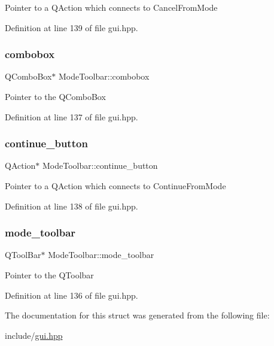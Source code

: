 Pointer to a Q\+Action which connects to Cancel\+From\+Mode 

Definition at line 139 of file gui.\+hpp.

\mbox{\label{structModeToolbar_ad0ba4f03ef2a44e2543add404a50b4f1}} 
\subsubsection{\texorpdfstring{combobox}{combobox}}
{\footnotesize\ttfamily Q\+Combo\+Box$\ast$ Mode\+Toolbar\+::combobox}

Pointer to the Q\+Combo\+Box 

Definition at line 137 of file gui.\+hpp.

\mbox{\label{structModeToolbar_af7d7766f5b1710abb382c42689e963ca}} 
\subsubsection{\texorpdfstring{continue\+\_\+button}{continue\_button}}
{\footnotesize\ttfamily Q\+Action$\ast$ Mode\+Toolbar\+::continue\+\_\+button}

Pointer to a Q\+Action which connects to Continue\+From\+Mode 

Definition at line 138 of file gui.\+hpp.

\mbox{\label{structModeToolbar_acc6bcdd91825343f34ec38d312418234}} 
\subsubsection{\texorpdfstring{mode\+\_\+toolbar}{mode\_toolbar}}
{\footnotesize\ttfamily Q\+Tool\+Bar$\ast$ Mode\+Toolbar\+::mode\+\_\+toolbar}

Pointer to the Q\+Toolbar 

Definition at line 136 of file gui.\+hpp.



The documentation for this struct was generated from the following file\+:\begin{DoxyCompactItemize}
\item 
include/\mbox{\hyperlink{gui_8hpp}{gui.\+hpp}}\end{DoxyCompactItemize}
